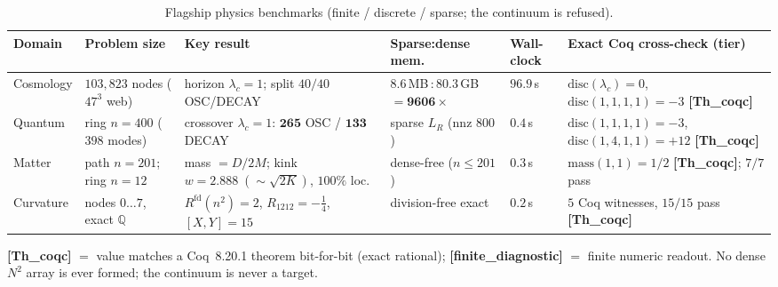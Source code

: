 \begin{table}[t]
  \centering
  \footnotesize
  \setlength{\tabcolsep}{5pt}
  \begin{tabularx}{\textwidth}{@{}l l Y l l Y@{}}
    \toprule
    Domain & Problem size & Key result & Sparse:dense mem. & Wall-clock & Exact Coq cross-check (tier) \\
    \midrule
    Cosmology
      & $103{,}823$ nodes ($47^3$ web)
      & horizon $\lambda_c=1$; split $40/40$ OSC/DECAY
      & $8.6$\,MB\,:\,$80.3$\,GB $=\mathbf{9606\times}$
      & $96.9$\,s
      & $\mathrm{disc}(\lambda_c)=0$, $\mathrm{disc}(1,1,1,1)=-3$ \textbf{[Th\_coqc]} \\
    Quantum
      & ring $n=400$ ($398$ modes)
      & crossover $\lambda_c=1$: $\mathbf{265}$ OSC / $\mathbf{133}$ DECAY
      & sparse $L_R$ (nnz $800$)
      & $0.4$\,s
      & $\mathrm{disc}(1,1,1,1)=-3$, $\mathrm{disc}(1,4,1,1)=+12$ \textbf{[Th\_coqc]} \\
    Matter
      & path $n=201$; ring $n=12$
      & mass $=D/2M$; kink $w=2.888\;(\!\sim\!\sqrt{2K})$, $100\%$ loc.
      & dense-free ($n\!\le\!201$)
      & $0.3$\,s
      & $\mathrm{mass}(1,1)=1/2$ \textbf{[Th\_coqc]}; $7/7$ pass \\
    Curvature
      & nodes $0\ldots7$, exact $\mathbb{Q}$
      & $R^{\mathrm{fd}}(n^2)=2$, $R_{1212}=-\tfrac14$, $[X,Y]{=}15$
      & division-free exact
      & $0.2$\,s
      & $5$ Coq witnesses, $15/15$ pass \textbf{[Th\_coqc]} \\
    \bottomrule
  \end{tabularx}

  \vspace{2pt}
  \footnotesize
  \textbf{[Th\_coqc]} $=$ value matches a Coq~8.20.1 theorem bit-for-bit (exact rational);
  \textbf{[finite\_diagnostic]} $=$ finite numeric readout. No dense $N^2$ array is ever formed;
  the continuum is never a target.
  \caption{Flagship physics benchmarks (finite / discrete / sparse; the continuum is refused).}
  \label{tab:benchmark}
\end{table}
